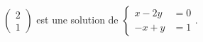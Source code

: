 $\begin{pmatrix}2\\1\end{pmatrix}$ est une solution de $\begin{cases}x-2y &= 0 \\ -x+y &= 1\end{cases}$.

\begin{reponses}
\end{reponses}

